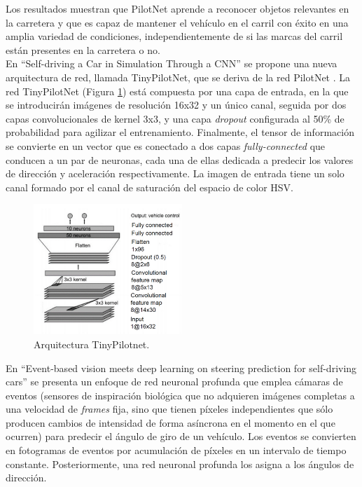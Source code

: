 Los resultados muestran que PilotNet aprende a reconocer objetos relevantes en la carretera y que es capaz de mantener el vehículo en el carril con éxito en una amplia variedad de condiciones, independientemente de si las marcas del carril están presentes en la carretera o no.\\


En ``Self-driving a Car in Simulation Through a CNN'' \cite{self-driving} se propone una nueva arquitectura de red, llamada TinyPilotNet, que se deriva de la red PilotNet \cite{end2end} \cite{explaining-end2end}. La red TinyPilotNet (Figura \ref{fig.tinypilotnet}) está compuesta por una capa de entrada, en la que se introducirán imágenes de resolución 16x32 y un único canal, seguida por dos capas convolucionales de kernel 3x3, y una capa \textit{dropout} configurada al 50\% de probabilidad para agilizar el entrenamiento. Finalmente, el tensor de información se convierte en un vector que es conectado a dos capas \textit{fully-connected} que conducen a un par de neuronas, cada una de ellas dedicada a predecir los valores de dirección y aceleración respectivamente. La imagen de entrada tiene un solo canal formado por el canal de saturación del espacio de color HSV.\\

\begin{figure}
\begin{center}
	\includegraphics[width=0.5\textwidth]{figures/Estado_arte/tinypilotnet.png}
   \caption{Arquitectura TinyPilotnet.}
	\label{fig.tinypilotnet}
\end{center}
\end{figure}

En ``Event-based  vision  meets  deep  learning  on  steering  prediction  for self-driving  cars'' \cite{event} se presenta un enfoque de red neuronal profunda que emplea cámaras de eventos (sensores de inspiración biológica que no adquieren imágenes completas a una velocidad de \textit{frames} fija, sino que tienen píxeles independientes que sólo producen cambios de intensidad de forma asíncrona en el momento en el que ocurren) para predecir el ángulo de giro de un vehículo. Los eventos se convierten en fotogramas de eventos por acumulación de píxeles en un intervalo de tiempo constante. Posteriormente, una red neuronal profunda los asigna a los ángulos de dirección.\\

